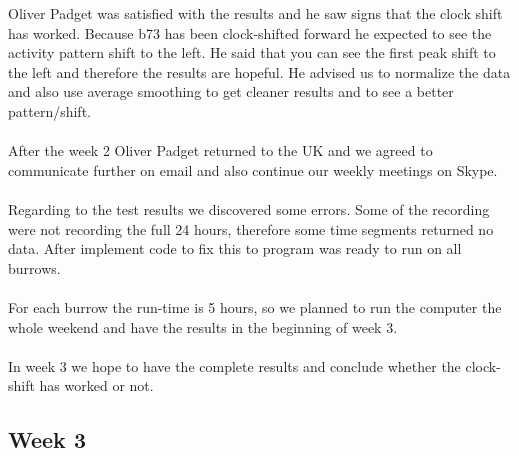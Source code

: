 \documentclass[a4paper]{article}
\begin{document}
Oliver Padget was satisfied with the results and he saw signs that the clock shift has worked. Because b73 has been clock-shifted forward he expected to see the activity pattern shift to the left. He said that you can see the first peak shift to the left and therefore the results are hopeful. He advised us to normalize the data and also use average smoothing to get cleaner results and to see a better pattern/shift.\\\\
After the week 2 Oliver Padget returned to the UK and we agreed to communicate further on email and also continue our weekly meetings on Skype.\\\\
Regarding to the test results we discovered some errors. Some of the recording were not recording the full 24 hours, therefore some time segments returned no data. After implement code to fix this to program was ready to run on all burrows.\\\\
For each burrow the run-time is 5 hours, so we planned to run the computer the whole weekend and have the results in the beginning of week 3.\\\\
In week 3 we hope to have the complete results and conclude whether the clock-shift has worked or not. 

\subsection*{Week 3}
\end{document}
